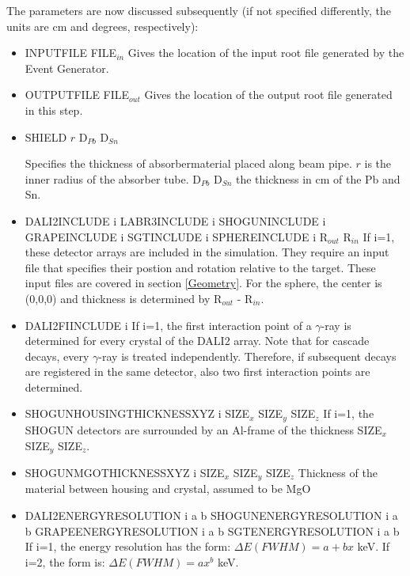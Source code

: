 \documentclass[12pt]{book}
\begin{document}
The parameters are now discussed subsequently (if not specified differently, 
the units are cm and degrees, respectively):\hfill{}
\begin{itemize}
\item INPUTFILE FILE$_{in}$ \hfill{} \linebreak
  Gives the location of the input root file generated by the Event Generator.
\item OUTPUTFILE FILE$_{out}$ \hfill{} \linebreak
  Gives the location of the output root file generated in this step.
\item SHIELD $r$ D$_{Pb}$ D$_{Sn}$ \hfill{} \linebreak 
  
  Specifies the thickness of absorbermaterial placed along beam pipe. 
  $r$ is the inner radius of the absorber tube. D$_{Pb}$ D$_{Sn}$ the
  thickness in cm of the Pb and Sn.

\item DALI2INCLUDE i\hfill{} \linebreak
  LABR3INCLUDE i\hfill{} \linebreak
  SHOGUNINCLUDE i\hfill{} \linebreak
  GRAPEINCLUDE i\hfill{} \linebreak
  SGTINCLUDE i\hfill{} \linebreak
  SPHEREINCLUDE i R$_{out}$ R$_{in}$ \hfill{} \linebreak
  If i=1, these detector arrays are included in the simulation. They require an input file that 
  specifies their postion and rotation relative to the target. These input files are covered in section
  \ref{Geometry}. For the sphere, the center is (0,0,0) and thickness is determined by R$_{out}$ - R$_{in}$. 
\item DALI2FIINCLUDE i\hfill{} \linebreak
  If i=1, the first interaction point of a $\gamma$-ray is determined for every crystal of the DALI2 array. Note that for
  cascade decays, every $\gamma$-ray is treated independently. Therefore, if subsequent decays are 
  registered in the same detector, also two first interaction points are determined.
\item SHOGUNHOUSINGTHICKNESSXYZ i SIZE$_{x}$ SIZE$_{y}$ SIZE$_{z}$\hfill{} \linebreak
  If i=1, the SHOGUN detectors are surrounded by an Al-frame of the thickness SIZE$_{x}$ SIZE$_{y}$ SIZE$_{z}$. 
\item SHOGUNMGOTHICKNESSXYZ i SIZE$_{x}$ SIZE$_{y}$ SIZE$_{z}$\hfill{} \linebreak
  Thickness of the material between housing and crystal, assumed to be MgO
\item DALI2ENERGYRESOLUTION i a b\hfill{} \linebreak
  SHOGUNENERGYRESOLUTION i a b\hfill{} \linebreak
  GRAPEENERGYRESOLUTION i a b\hfill{} \linebreak
  SGTENERGYRESOLUTION i a b\hfill{} \linebreak
  If i=1, the energy resolution has the form: $\Delta E (FWHM) = a + bx$ keV. If i=2, the form is: $\Delta E (FWHM) = ax^{b}$ keV.
  

\end{itemize}
\end{document}
